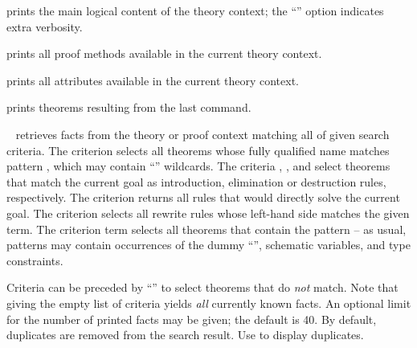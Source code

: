 \begin{isabellebody}
\begin{isamarkuptext}
\begin{description}
  \item \hyperlink{command.print-theory}{\mbox{}} prints the main logical content of
  the theory context; the ``\isa{{\isachardoublequote}{\isacharbang}{\isachardoublequote}}'' option indicates extra
  verbosity.

  \item \hyperlink{command.print-methods}{\mbox{}} prints all proof methods
  available in the current theory context.
  
  \item \hyperlink{command.print-attributes}{\mbox{}} prints all attributes
  available in the current theory context.
  
  \item \hyperlink{command.print-theorems}{\mbox{}} prints theorems resulting from
  the last command.
  
  \item \hyperlink{command.find-theorems}{\mbox{}}~ retrieves facts
  from the theory or proof context matching all of given search
  criteria.  The criterion  selects all theorems
  whose fully qualified name matches pattern , which may
  contain ``\isa{{\isachardoublequote}{\isacharasterisk}{\isachardoublequote}}'' wildcards.  The criteria ,
  , and  select theorems that match the
  current goal as introduction, elimination or destruction rules,
  respectively.  The criterion  returns all rules
  that would directly solve the current goal.  The criterion
   selects all rewrite rules whose left-hand side
  matches the given term.  The criterion term  selects all
  theorems that contain the pattern  -- as usual, patterns
  may contain occurrences of the dummy ``\isa{{\isacharunderscore}}'', schematic
  variables, and type constraints.
  
  Criteria can be preceded by ``\isa{{\isachardoublequote}{\isacharminus}{\isachardoublequote}}'' to select theorems that
  do \emph{not} match. Note that giving the empty list of criteria
  yields \emph{all} currently known facts.  An optional limit for the
  number of printed facts may be given; the default is 40.  By
  default, duplicates are removed from the search result. Use
   to display duplicates.


\end{description}
\end{isamarkuptext}
\end{isabellebody}
